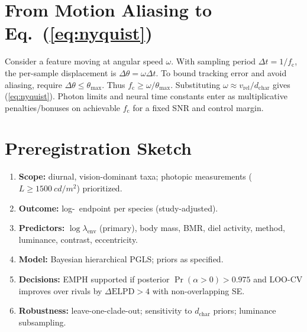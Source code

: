 \documentclass[11pt]{article}
\newcommand{\fc}{f_{\mathrm{c}}}             %
\newcommand{\cff}{\mathrm{CFF}}               %
\newcommand{\vrel}{v_{\mathrm{rel}}}          %
\newcommand{\dchar}{d_{\mathrm{char}}}        %
\newcommand{\lamenv}{\lambda_{\mathrm{env}}}  %
\newcommand{\thetamax}{\theta_{\max}}         %
\newcommand{\Lumin}{L}                        %
\begin{document}
\section{From Motion Aliasing to Eq.~(\ref{eq:nyquist})}
Consider a feature moving at angular speed $\omega$. With sampling period $\Delta t = 1/\fc$, the per-sample displacement is $\Delta \theta = \omega \Delta t$. To bound tracking error and avoid aliasing, require $\Delta \theta \le \thetamax$. Thus $\fc \ge \omega/\thetamax$. Substituting $\omega \approx \vrel/\dchar$ gives (\ref{eq:nyquist}). Photon limits and neural time constants enter as multiplicative penalties/bonuses on achievable $\fc$ for a fixed SNR and control margin.

\section{Preregistration Sketch}
\begin{enumerate}[leftmargin=1.5em]
\item \textbf{Scope:} diurnal, vision-dominant taxa; photopic measurements ($\Lumin \ge \SI{1500}{cd/m^2}$) prioritized.
\item \textbf{Outcome:} log-\cff\ endpoint per species (study-adjusted).
\item \textbf{Predictors:} $\log\lamenv$ (primary), body mass, BMR, diel activity, method, luminance, contrast, eccentricity.
\item \textbf{Model:} Bayesian hierarchical PGLS; priors as specified.
\item \textbf{Decisions:} EMPH supported if posterior $\Pr(\alpha>0) > 0.975$ and LOO-CV improves over rivals by $\Delta \mathrm{ELPD} > 4$ with non-overlapping SE.
\item \textbf{Robustness:} leave-one-clade-out; sensitivity to $\dchar$ priors; luminance subsampling.
\end{enumerate}
\end{document}
